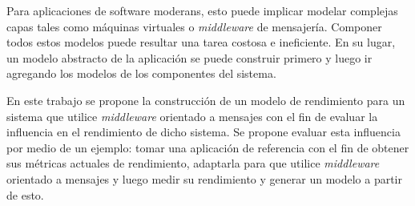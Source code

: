 \documentclass[11pt, twoside]{report}
\begin{document}
Para aplicaciones de software moderans, esto puede implicar modelar complejas capas tales como máquinas virtuales o \emph{middleware} de mensajería. Componer todos estos modelos puede resultar una tarea costosa e ineficiente. En su lugar, un modelo abstracto de la aplicación se puede construir primero y luego ir agregando los modelos de los componentes del sistema. 

En este trabajo se propone la construcción de un modelo de rendimiento para un sistema que utilice \emph{middleware} orientado a mensajes con el fin de evaluar la influencia en el rendimiento de dicho sistema. Se propone evaluar esta influencia por medio de un ejemplo: tomar una aplicación de referencia con el fin de obtener sus métricas actuales de rendimiento, adaptarla para que utilice \emph{middleware} orientado a mensajes y luego medir su rendimiento y generar un modelo a partir de esto. 


%
\end{document}
